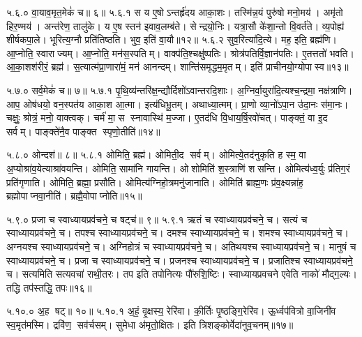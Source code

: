 ५.६.०
वा॒याव॒मृत॒मेकं॑ च॥ ६॥
५.६.१
स य ए॒षोऽन्तर्\mbox{}हृ॑दय आका॒शः। तस्मि॑न्न॒यं पुरु॑षो मनो॒मय॑। अमृ॑तो हिर॒ण्मय॑। अन्त॑रेण॒ तालु॑के। य ए॒ष स्तन॑ इवाव॒लम्ब॑ते। सेन्द्रयो॒निः। यत्रा॒सौ के॑शा॒न्तो वि॒वर्त॑ते। व्य॒पोह्य॑ शीर्\mbox{}षकपा॒ले। भूरित्य॒ग्नौ प्रति॑तिष्ठति। भुव॒ इति॑ वा॒यौ॥१२॥
५.६.२
सुव॒रित्या॑दि॒त्ये। मह॒ इति॒ ब्रह्म॑णि। आ॒प्नोति॒ स्वाराज्यम्। आ॒प्नोति॒ मन॑स॒स्पतिम्। वाक्प॑ति॒श्चक्षु॑ष्पतिः। श्रोत्र॑पतिर्वि॒ज्ञान॑पतिः। ए॒तत्ततो॑ भवति। आ॒का॒शश॑रीरं॒ ब्रह्म॑। स॒त्यात्म॑प्रा॒णारा॑मं॒ मन॑ आनन्दम्। शान्ति॑समृद्धम॒मृतम्। इति॑ प्राचीनयो॒ग्योपास्व॥१३॥
\anuvakamend

५.७.०
सर्व॒मेकं॑ च॥ ७॥
५.७.१
पृ॒थि॒व्य॑न्तरि॑क्ष॒न्द्यौर्दिशो॑ऽवान्तरदि॒शाः। अ॒ग्निर्वा॒युरा॑दि॒त्यश्च॒न्द्रमा॒ नक्ष॑त्राणि। आप॒ ओष॑धयो॒ वन॒स्पत॑य आका॒श आ॒त्मा। इत्य॑धिभू॒तम्। अथाध्या॒त्मम्। प्रा॒णो व्या॒नो॑ऽपा॒न उ॑दा॒नः स॑मा॒नः। चक्षुः॒ श्रोत्रं॒ मनो॒ वाक्त्वक्। चर्म॑ मा॒स स्नावास्थि॑ म॒ज्जा। ए॒तद॑धि वि॒धाय॒र्\mbox{}षि॒रवो॑चत्। पाङ्क्तं॒ वा इ॒द सर्वम्। पाङ्क्ते॑नै॒व पाङ्क्त स्पृणो॒तीति॑॥१४॥
\anuvakamend

५.८.०
ओन्दश॑॥ ८॥
५.८.१
ओमिति॒ ब्रह्म॑। ओमिती॒द सर्वम्। ओमित्ये॒तद॑नुकृति ह स्म॒ वा अ॒प्योश्रा॑व॒येत्याश्रा॑वयन्ति। ओमिति॒ सामा॑नि गायन्ति। ओशोमिति॑ श॒स्त्राणि॑ शसन्ति। ओमित्य॑ध्व॒र्युः प्र॑तिग॒रं प्रति॑गृणाति। ओमिति॒ ब्रह्मा॒ प्रसौ॑ति। ओमित्य॑ग्निहो॒त्रमनु॑जानाति। ओमिति॑ ब्राह्म॒णः प्र॑व॒क्ष्यन्ना॑ह॒ ब्रह्मोपाप्नवा॒नीति॑। ब्रह्मै॒वोपाप्नोति॥१५॥
\anuvakamend

५.९.०
प्रजा च स्वाध्यायप्रव॑चने॒ च षट्च॑॥ ९॥
५.९.१
ऋतं च स्वाध्यायप्रव॑चने॒ च। सत्यं च स्वाध्यायप्रव॑चने॒ च। तपश्च स्वाध्यायप्रव॑चने॒ च। दमश्च स्वाध्यायप्रव॑चने॒ च। शमश्च स्वाध्यायप्रव॑चने॒ च। अग्नयश्च स्वाध्यायप्रव॑चने॒ च। अग्निहोत्रं च स्वाध्यायप्रव॑चने॒ च। अतिथयश्च स्वाध्यायप्रव॑चने॒ च। मानुषं च स्वाध्यायप्रव॑चने॒ च। प्रजा च स्वाध्यायप्रव॑चने॒ च। प्रजनश्च स्वाध्यायप्रव॑चने॒ च। प्रजातिश्च स्वाध्यायप्रव॑चने॒ च। सत्यमिति सत्यवचा॑ राथी॒तरः। तप इति तपोनित्यः पौ॑रुशि॒ष्टिः। स्वाध्यायप्रवचने एवेति नाको॑ मौद्ग॒ल्यः। तद्धि तप॑स्तद्धि॒ तपः॥१६॥
\anuvakamend

५.१०.०
अ॒ह षट्॥ १०॥
५.१०.१
अ॒हं॒ वृ॒क्षस्य॒ रेरि॑वा। की॒र्तिः पृ॒ष्ठङ्गि॒रेरि॑व। ऊ॒र्ध्वप॑वित्रो वा॒जिनी॑व स्व॒मृत॑मस्मि। द्रवि॑ण॒ सव॑र्चसम्। सुमेधा अ॑मृतो॒क्षितः। इति त्रिशङ्कोर्वेदा॑नुव॒चनम्॥१७॥
\anuvakamend

